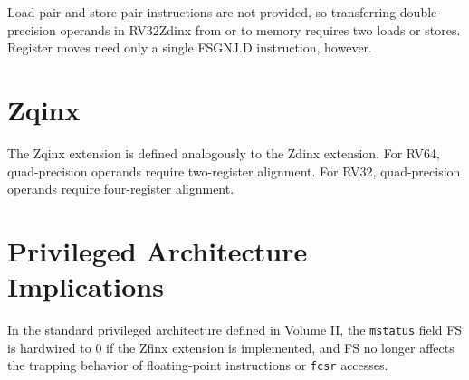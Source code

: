 \begin{commentary}
Load-pair and store-pair instructions are not provided, so transferring
double-precision operands in RV32Zdinx from or to memory requires
two loads or stores.
Register moves need only a single FSGNJ.D instruction, however.
\end{commentary}

\section{Zqinx}

The Zqinx extension is defined analogously to the Zdinx extension.
For RV64, quad-precision operands require two-register alignment.
For RV32, quad-precision operands require four-register alignment.

\section{Privileged Architecture Implications}

In the standard privileged architecture defined in Volume II, the
{\tt mstatus} field FS is hardwired to 0 if the Zfinx extension is
implemented, and FS no longer affects the trapping behavior of
floating-point instructions or {\tt fcsr} accesses.
